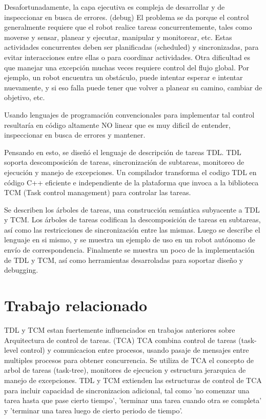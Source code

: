 \documentclass{article}
\begin{document}
Desafortunadamente, la capa ejecutiva es compleja de desarrollar y de
inspeccionar en busca de errores. (debug)
El problema se da porque el control generalmente requiere que el robot
realice tareas concurrentemente, tales como moverse y sensar,
planear y ejecutar, manipular y monitorear, etc.
Estas actividades concurrentes deben ser planificadas (scheduled) y
sincronizadas, para evitar interacciones entre ellas o para
coordinar actividades.
Otra dificultad es que manejar una excepción muchas veces requiere control
del flujo global.
Por ejemplo, un robot encuentra un obstáculo, puede intentar esperar e
intentar nuevamente, y si eso falla puede tener que volver a 
planear su camino, cambiar de objetivo, etc.

Usando lenguajes de programación convencionales para implementar tal control
resultaría en código altamente NO linear que es muy 
dificil de entender, inspeccionar en busca de errores y mantener.

Pensando en esto, se diseñó el lenguaje de descripción de tareas TDL.
TDL soporta descomposición de tareas, sincronización de subtareas, monitoreo
de ejecución y manejo de excepciones.
Un compilador transforma el codigo TDL en código C++ eficiente e independiente
de la plataforma que invoca a la biblioteca TCM (Task control management)
para controlar las tareas.

Se describen los árboles de tareas, una construcción semántica subyacente a
TDL y TCM. 
Los árboles de tareas codifican la descomposición de tareas en subtareas, así
como las restricciones de sincronización entre las mismas.
Luego se describe el lenguaje en si mismo, y se muestra un ejemplo de uso en
un robot autónomo de envío de correspondencia.
Finalmente se muestra un poco de la implementación de TDL y TCM, así como
herramientas desarroladas para soportar diseño y debugging.


\section{Trabajo relacionado}

TDL y TCM estan fuertemente influenciados en trabajos anteriores sobre
 Arquitectura de control de tareas. (TCA)
TCA combina control de tareas (task-level control) y comunicacion entre
 procesos, usando pasaje de mensajes entre multiples procesos
para obtener concurrencia. 
Se utiliza de TCA el concepto de arbol de tareas (task-tree), monitores de 
ejecucion y estructura jerarquica de manejo de excepciones.
TDL y TCM extienden las estructuras de control de TCA para incluir 
capacidad de sincronizacion adicional, tal como 'no comenzar una tarea hasta 
que pase cierto tiempo', 'terminar una tarea cuando otra se completa' y 
'terminar una tarea luego de cierto periodo de tiempo'.
\end{document}

